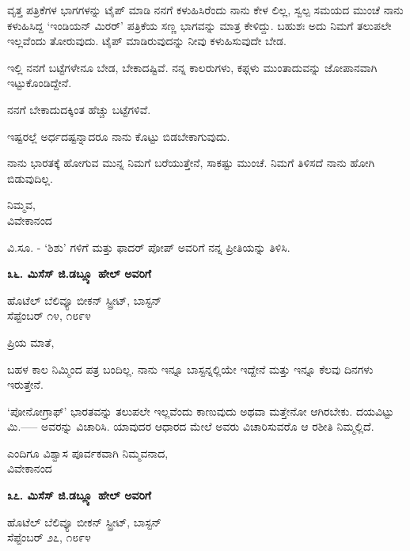 ವೃತ್ತ ಪತ್ರಿಕೆಗಳ ಭಾಗಗಳನ್ನು ಟೈಪ್ ಮಾಡಿ ನನಗೆ ಕಳುಹಿಸಿರೆಂದು ನಾನು ಕೇಳ ಲಿಲ್ಲ, ಸ್ವಲ್ಪ ಸಮಯದ ಮುಂಚೆ ನಾನು ಕಳುಹಿಸಿದ್ದ ‘ಇಂಡಿಯನ್ ಮಿರರ್’ ಪತ್ರಿಕೆಯ ಸಣ್ಣ ಭಾಗವನ್ನು ಮಾತ್ರ ಕೇಳಿದ್ದು. ಬಹುಶಃ ಅದು ನಿಮಗೆ ತಲುಪಲೇ ಇಲ್ಲವೆಂದು ತೋರುವುದು. ಟೈಪ್ ಮಾಡಿರುವುದನ್ನು ನೀವು ಕಳುಹಿಸುವುದೇ ಬೇಡ.

ಇಲ್ಲಿ ನನಗೆ ಬಟ್ಟೆಗಳೇನೂ ಬೇಡ, ಬೇಕಾದಷ್ಟಿವೆ. ನನ್ನ ಕಾಲರುಗಳು, ಕಫ್ಗಳು ಮುಂತಾದುವನ್ನು ಜೋಪಾನವಾಗಿ ಇಟ್ಟುಕೊಂಡಿದ್ದೇನೆ.

ನನಗೆ ಬೇಕಾದುದಕ್ಕಿಂತ ಹೆಚ್ಚು ಬಟ್ಟೆಗಳಿವೆ.

ಇಷ್ಟರಲ್ಲೆ ಅರ್ಧದಷ್ಟನ್ನಾದರೂ ನಾನು ಕೊಟ್ಟು ಬಿಡಬೇಕಾಗುವುದು.

ನಾನು ಭಾರತಕ್ಕೆ ಹೋಗುವ ಮುನ್ನ ನಿಮಗೆ ಬರೆಯುತ್ತೇನೆ, ಸಾಕಷ್ಟು ಮುಂಚೆ. ನಿಮಗೆ ತಿಳಿಸದೆ ನಾನು ಹೋಗಿ ಬಿಡುವುದಿಲ್ಲ.

\begin{flushright}
ನಿಮ್ಮವ,\\ವಿವೇಕಾನಂದ
\end{flushright}

ವಿ.ಸೂ. - ‘ಶಿಶು’ ಗಳಿಗೆ ಮತ್ತು ಫಾದರ್ ಪೋಪ್ ಅವರಿಗೆ ನನ್ನ ಪ್ರೀತಿಯನ್ನು ತಿಳಿಸಿ.

\begin{center}
\textbf{೩೬. ಮಿಸೆಸ್ ಜಿ.ಡಬ್ಲ್ಯೂ ಹೇಲ್ ಅವರಿಗೆ}
\end{center}

\begin{flushright}
ಹೊಟೆಲ್ ಬೆಲಿವ್ಯೂ ಬೀಕನ್ ಸ್ಟ್ರೀಟ್, ಬಾಸ್ಟನ್\\ಸೆಪ್ಟೆಂಬರ್ ೧೪, ೧೮೯೪
\end{flushright}

ಪ್ರಿಯ ಮಾತೆ,

ಬಹಳ ಕಾಲ ನಿಮ್ಮಿಂದ ಪತ್ರ ಬಂದಿಲ್ಲ. ನಾನು ಇನ್ನೂ ಬಾಸ್ಟನ್ನಲ್ಲಿಯೇ ಇದ್ದೇನೆ ಮತ್ತು ಇನ್ನೂ ಕೆಲವು ದಿನಗಳು ಇರುತ್ತೇನೆ.

‘ಪೋನೋಗ್ರಾಫ್’ ಭಾರತವನ್ನು ತಲುಪಲೇ ಇಲ್ಲವೆಂದು ಕಾಣುವುದು ಅಥವಾ ಮತ್ತೇನೋ ಆಗಿರಬೇಕು. ದಯವಿಟ್ಟು ಮಿ.----- ಅವರನ್ನು ವಿಚಾರಿಸಿ. ಯಾವುದರ ಆಧಾರದ ಮೇಲೆ ಅವರು ವಿಚಾರಿಸುವರೊ ಆ ರಶೀತಿ ನಿಮ್ಮಲ್ಲಿದೆ.

\begin{flushright}
ಎಂದಿಗೂ ವಿಶ್ವಾಸ ಪೂರ್ವಕವಾಗಿ ನಿಮ್ಮವನಾದ,\\ವಿವೇಕಾನಂದ
\end{flushright}

\begin{center}
\textbf{೩೭. ಮಿಸೆಸ್ ಜಿ.ಡಬ್ಲ್ಯೂ ಹೇಲ್ ಅವರಿಗೆ}
\end{center}

\begin{flushright}
ಹೊಟೆಲ್ ಬೆಲಿವ್ಯೂ ಬೀಕನ್ ಸ್ಟ್ರೀಟ್, ಬಾಸ್ಟನ್\\ಸೆಪ್ಟೆಂಬರ್ ೨೭, ೧೮೯೪
\end{flushright}

